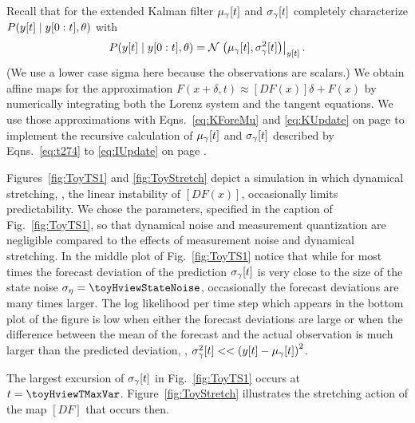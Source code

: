 Recall that for the extended Kalman filter ${\mu_\gamma}{[t]}$ and
${\sigma_\gamma}{[t]}$ completely characterize
$ P({y}{[t]}\mid y[0:t],\theta)$ with
\begin{equation*}
  P({y}{[t]}\mid y[0:t],\theta) =
  {\mathcal{N}}\left.\left({\mu_\gamma}{[t]},{\sigma^2_\gamma}{[t]}\right)\right|_{{y}{[t]}}.
\end{equation*}
(We use a lower case sigma here because the observations are scalars.)
We obtain affine maps for the approximation $F(x+\delta,t) \approx
\left[ DF(x)\right]\delta + F(x)$ %
%
by numerically integrating both the Lorenz system and the tangent
equations.  We use those approximations with Eqns.~\eqref{eq:KForeMu}
and \eqref{eq:KUpdate} on page \pageref{eq:KUpdate} to implement the
recursive calculation of ${\mu_\gamma}{[t]}$ and
${\sigma_\gamma}{[t]}$ described by Eqns.~\eqref{eq:t274} to
\eqref{eq:IUpdate} on page \pageref{eq:IUpdate}.

Figures~\ref{fig:ToyTS1} and \ref{fig:ToyStretch} depict a simulation
in which dynamical stretching, \ie, the linear instability of
$\left[ DF(x)\right]$, occasionally limits predictability.  We chose
the parameters, specified in the caption of Fig.~\ref{fig:ToyTS1}, so
that dynamical noise and measurement quantization are negligible
compared to the effects of measurement noise and dynamical stretching.
In the middle plot of Fig.~\ref{fig:ToyTS1} notice that while for most
times the forecast deviation of the prediction ${\sigma_\gamma}{[t]}$
is very close to the size of the state noise
$\sigma_\eta = \toyHviewStateNoise$, occasionally the forecast
deviations are many times larger.  The log likelihood per time step
which appears in the bottom plot of the figure is low when either the
forecast deviations are large or when the difference between the mean
of the forecast and the actual observation is much larger than the
predicted deviation, \ie,
${\sigma^2_\gamma}{[t]} <<
\left({y}{[t]}-{\mu_\gamma}{[t]}\right)^2$.

The largest excursion of ${\sigma_\gamma}{[t]}$ in
Fig.~\ref{fig:ToyTS1} occurs at $t=\toyHviewTMaxVar$.
Figure~\ref{fig:ToyStretch} illustrates the stretching action of the
map $[DF]$ that occurs then.

